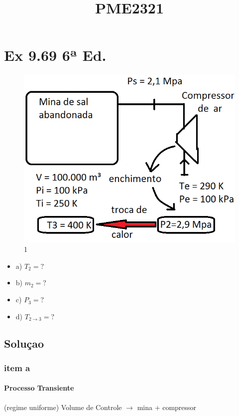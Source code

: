 \documentclass[a4paper, 12pt]{article}
\title{PME2321}
\begin{document}
\maketitle

\section{Ex 9.69 6ª Ed.}

\begin{figure}[h]
\begin{center}
\includegraphics[scale=0.58]{./fig/1.png}
\caption{\label{fig:1}1} 
\end{center}
\end{figure}
\begin{itemize}
\item	a) $T_{2}=?$
\item	b) $m_{2}=?$
\item	c) $P_{3}=?$
\item	d) $T_{2 \rightarrow 3}=?$
\end{itemize}

\subsection*{Soluçao}

\subsubsection*{item a}

\paragraph*{Processo Transiente} (regime uniforme)
Volume de Controle $\rightarrow$ mina $+$ compressor
\end{document}
